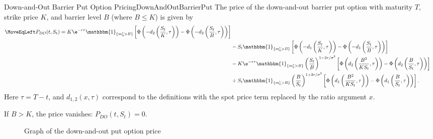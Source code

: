 \begin{prop}{Down-and-Out Barrier Put Option Pricing}{DownAndOutBarrierPut}
	The price of the down-and-out barrier put option with maturity $T$, strike price $K$, and barrier level $B$ (where $B \le K$) is given by
	\begin{align}
		\MoveEqLeft P_{DO}(t, S_t) = K \e^{-r\tau} \mathbbm{1}_{\{m_0^t > B\}} \left[ \Phi \left( -d_2 \left( \frac{S_t}{K}, \tau \right) \right) - \Phi \left( -d_2 \left( \frac{S_t}{B}, \tau \right) \right) \right] \nonumber                        \\
		 & - S_t \mathbbm{1}_{\{m_0^t > B\}} \left[ \Phi \left( -d_1 \left( \frac{S_t}{K}, \tau \right) \right) - \Phi \left( -d_1 \left( \frac{S_t}{B}, \tau \right) \right) \right] \nonumber                                                          \\
		 & - K \e^{-r\tau} \mathbbm{1}_{\{m_0^t > B\}} \left( \frac{S_t}{B} \right)^{1-2r/\sigma^2} \left[ \Phi \left( d_2 \left( \frac{B^2}{K S_t}, \tau \right) \right) - \Phi \left( d_2 \left( \frac{B}{S_t}, \tau \right) \right) \right] \nonumber \\
		 & + S_t \mathbbm{1}_{\{m_0^t > B\}} \left( \frac{B}{S_t} \right)^{1+2r/\sigma^2} \left[ \Phi \left( d_1 \left( \frac{B^2}{K S_t}, \tau \right) \right) - \Phi \left( d_1 \left( \frac{B}{S_t}, \tau \right) \right) \right].
	\end{align}
	Here $\tau = T-t$, and $d_{1,2}(x, \tau)$ correspond to the definitions with the spot price term replaced by the ratio argument $x$.

	If $B > K$, the price vanishes: $P_{DO}(t, S_t) = 0$.
\end{prop}

\begin{figure}[H]
	\centering
	
	\caption{Graph of the down-and-out put option price}
	\label{fig:downAndOutPutBarrierSurface}
\end{figure}

